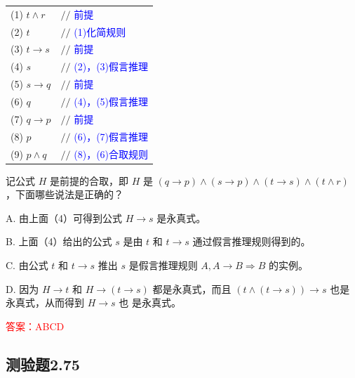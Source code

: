 \documentclass[UTF8, heading=true]{ctexart}
\begin{document}
\begin{table}[H]
  \centering
  \renewcommand{\arraystretch}{1.5}
  \begin{tabular}{ll}
    (1)  $t \wedge r$ & $/ / $ \textcolor{blue}{{前提}} \\
    (2)  $t$ & $/ / $ \textcolor{blue}{{(1)化简规则}} \\
    (3)  $t \rightarrow s$ & $/ / $ \textcolor{blue}{{前提}} \\
    (4)  $s$ & $/ / $ \textcolor{blue}{{(2)，(3)假言推理}} \\
    (5)  $s \rightarrow q$ & $/ / $ \textcolor{blue}{{前提}} \\
    (6)  $q$ & $/ / $ \textcolor{blue}{{(4)，(5)假言推理}} \\
    (7)  $q \rightarrow p$ & $/ / $ \textcolor{blue}{{前提}} \\
    (8)  $p$ & $/ / $ \textcolor{blue}{{(6)，(7)假言推理}} \\
    (9)  $p \wedge q$ & $/ / $ \textcolor{blue}{{(8)，(6)合取规则}} \\
  \end{tabular}
\end{table}


记公式 $H$ 是前提的合取，即 $H$ 是 $(q \rightarrow p) \wedge(s \rightarrow p) \wedge(t \rightarrow s) \wedge(t \wedge r)$ ，下面哪些说法是正确的？

A. 由上面（4）可得到公式 $H \rightarrow s$ 是永真式。

B. 上面（4）给出的公式 $s$ 是由 $t$ 和 $t \rightarrow s$ 通过假言推理规则得到的。

C. 由公式 $t$ 和 $t \rightarrow s$ 推出 $s$ 是假言推理规则 $A, A \rightarrow B \Longrightarrow B$ 的实例。

D. 因为 $H \rightarrow t$ 和 $H \rightarrow(t \rightarrow s)$ 都是永真式，而且 $(t \wedge(t \rightarrow s)) \rightarrow s$ 也是永真式，从而得到 $H \rightarrow s$ 也
是永真式。

\textcolor{red}{答案：ABCD}

\subsection{测验题2.75}
\end{document}
